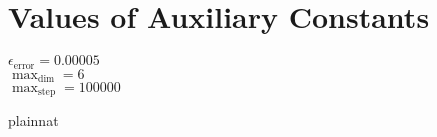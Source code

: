 \documentclass[12pt]{article}
\begin{document}




\section{Values of Auxiliary Constants}

$\epsilon_{\text{error}} = 0.00005$
\\
$\max_{\text{dim}} = 6$
\\
$\max_{\text{step}} = 100000$

\newpage

 {plainnat}





\end{document}
